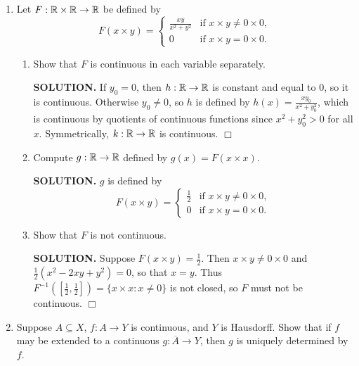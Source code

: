 \documentclass{article}
\begin{document}
\begin{enumerate}
    {\bf SOLUTION.} We write $h$ as $F \circ f$ and $k$ as $F \circ g$, where $f, g$ are the imbeddings defined in Exercise 4. By continuity of $f, g, F$ and continuity of composites, $h, k$ are continuous. $\Box$

    \item Let $F: \mathbb{R} \times \mathbb{R} \rightarrow \mathbb{R}$ be defined by
    $$F(x\times y) = \begin{cases}
        \frac{xy}{x^2+y^2} &\text{if } x\times y \neq 0 \times 0, \\
        0 &\text{if } x \times y = 0\times 0.
    \end{cases}$$

    \begin{enumerate}
        \item Show that $F$ is continuous in each variable separately.

        {\bf SOLUTION.} If $y_0 = 0$, then $h: \mathbb{R} \rightarrow \mathbb{R}$ is constant and equal to $0$, so it is continuous. Otherwise $y_0 \neq 0$, so $h$ is defined by $h(x) = \frac{xy_0}{x^2+y_0^2}$, which is continuous by quotients of continuous functions since $x^2+y_0^2 >0$ for all $x.$ Symmetrically, $k: \mathbb{R} \rightarrow \mathbb{R}$ is continuous. $\Box$
        
        \item Compute $g: \mathbb{R} \rightarrow \mathbb{R}$ defined by $g(x) = F(x \times x)$.

        {\bf SOLUTION.} $g$ is defined by
        $$F(x\times y) = \begin{cases}
            \frac12 &\text{if } x\times y \neq 0 \times 0, \\
            0 &\text{if } x \times y = 0\times 0.
        \end{cases}$$
        
        \item Show that $F$ is not continuous.

        {\bf SOLUTION.} Suppose $F(x \times y) = \frac12$. Then $x \times y \neq 0 \times 0$ and $\frac12(x^2-2xy+y^2) = 0$, so that $x = y$. Thus $F^{-1}([\frac12, \frac12]) = \{x \times x: x \neq 0\}$ is not closed, so $F$ must not be continuous. $\Box$
    \end{enumerate}

    \item Suppose $A \subseteq X$, $f: A \rightarrow Y$ is continuous, and $Y$ is Hausdorff. Show that if $f$ may be extended to a continuous $g: \overline{A} \rightarrow Y$, then $g$ is uniquely determined by $f$.


\end{enumerate}
\end{document}
